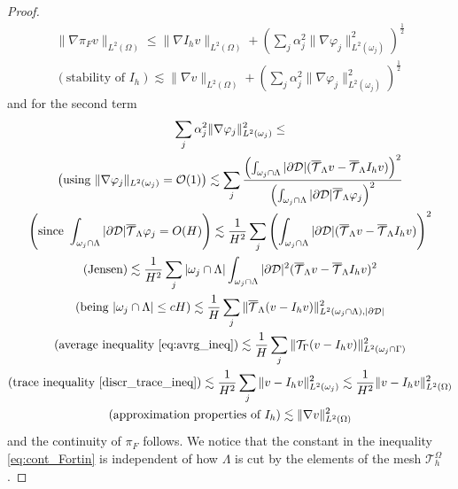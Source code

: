 \begin{proof}
\begin{multline*}
\|\nabla \pi_F v \|_{L^2(\Omega)} \leq \|\nabla I_h v\|_{L^2(\Omega)} + \left(\sum_j\alpha_j^2\|\nabla \varphi _j\|^2_{L^2(\omega_j)}\right)^{\frac 12}\\
(\text{stability of }I_h)\lesssim   \|\nabla  v\|_{L^2(\Omega)} + \left(\sum_j\alpha_j^2\|\nabla \varphi _j\|^2_{L^2(\omega_j)}\right)^{\frac 12}
\end{multline*}
and for the second term 
\begin{multline*}
\sum_j \alpha_j ^2\|\nabla \varphi _j\|^2_{L^2(\omega_j)}\leq
\\
\left(\text{using }\|\nabla \varphi _j\|_{{L^2(\omega_j)}}=\mathcal{O}(1)\right) \lesssim  \sum_j \frac{\left(\int_{\omega _j\cap \Lambda} |\partial\mathcal{D}| ({\overline{\mathcal{T}}_\Lambda} v-{\overline{\mathcal{T}}_\Lambda} I_h v)\right)^2}{\left(\int_{\omega _j\cap \Lambda}|\partial\mathcal{D}|{\overline{\mathcal{T}}_\Lambda} \varphi_j \right)^2}
\\
\left(\text{since }\int_{\omega _j\cap \Lambda}|\partial\mathcal{D}|{\overline{\mathcal{T}}_\Lambda} \varphi_j=O(H)\right) \lesssim \frac {1}{H^2} \sum_j \left(\int_{\omega _j\cap \Lambda} |\partial\mathcal{D}| ({\overline{\mathcal{T}}_\Lambda} v-{\overline{\mathcal{T}}_\Lambda} I_hv)\right)^2
\\
(\text{Jensen}) \lesssim  \frac {1}{H^2} \sum_j |\omega _j\cap \Lambda| \int_{\omega _j\cap \Lambda} |\partial\mathcal{D}|^2({\overline{\mathcal{T}}_\Lambda} v-{\overline{\mathcal{T}}_\Lambda} I_h v)^2
\\
(\text{being }|\omega _j\cap \Lambda| \leq cH)\lesssim  \frac {1}{H} \sum_j \| {\overline{\mathcal{T}}_\Lambda} (v-I_h v)\|^2_{L^2(\omega _j\cap \Lambda), |\partial\mathcal{D}|}
\\
(\text{average inequality \eqref{eq:avrg_ineq}} ) \lesssim  \frac {1}{H} \sum_j \| {\mathcal{T}_\Gamma}(v-I_h v)\|^2_{L^2(\omega _j\cap \Gamma)}  
\\
\left(\text{trace inequality \eqref{discr_trace_ineq}} \right)\lesssim  \frac {1}{H^2} \sum_j  \| v-I_h v\|^2_{L^2(\omega_j)} \lesssim  \frac {1}{H^2}  \| v-I_h v\|^2_{L^2(\Omega)} 
\\
(\text{approximation properties of }I_h)\lesssim \|\nabla  v\|^2_{L^2(\Omega)}
\end{multline*}
and the continuity of $\pi_F$ follows. We notice that the constant in the inequality \eqref{eq:cont_Fortin} is independent of how $\Lambda$  is cut by the elements of the mesh $\mathcal{T}_h^{\Omega}$.
\end{proof}

